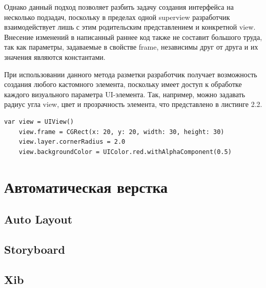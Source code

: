Однако данный подход позволяет разбить задачу создания интерфейса на несколько подзадач, поскольку в пределах одной superview разработчик взаимодействует лишь с этим родительским представлением и конкретной view. Внесение изменений в написанный раннее код также не составит большого труда, так как параметры, задаваемые в свойстве frame, независимы друг от друга и их значения являются константами.

При использовании данного метода разметки разработчик получает возможность создания любого кастомного элемента, поскольку имеет доступ к обработке каждого визуального параметра UI-элемента. Так, например, можно задавать радиус угла view, цвет и прозрачность элемента, что представлено в листинге 2.2.

\begin{lstlisting}[caption=Задание параметров view]
	var view = UIView()
	view.frame = CGRect(x: 20, y: 20, width: 30, height: 30)
	view.layer.cornerRadius = 2.0
	view.backgroundColor = UIColor.red.withAlphaComponent(0.5)
\end{lstlisting}



\section{Автоматическая верстка}
\subsection{Auto Layout}
\subsection{Storyboard}
\subsection{Xib}
